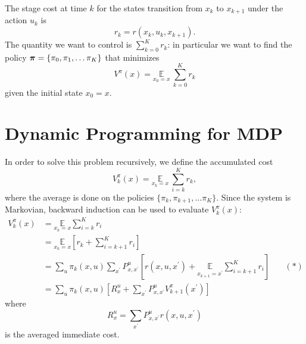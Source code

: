 The stage cost at time $k$ for the states transition from $x_k$ to $x_{k+1}$ under the action $u_k$ is
\begin{equation*}
  r_k = r(x_k,u_k,x_{k+1}).
\end{equation*}
The quantity we want to control is $\sum_{k=0}^K r_k$: in particular we want to find the policy $\boldsymbol{\pi}=\{\pi_0,\pi_1,\ldots \pi_K\}$ that minimizes
\begin{equation*}
  V^\pi(x) = \underset{x_0=x}{\mathbb{E}}\ \sum_{k=0}^K r_k
\end{equation*}
given the initial state $x_0=x$.

\section{Dynamic Programming for MDP}
\label{sec:MDP-dynamic-programming}

In order to solve this problem recursively, we define the accumulated cost
\begin{equation*}
  V_k^\pi(x) = \underset{x_k=x}{\mathbb{E}}\ \sum_{i=k}^K r_k,
\end{equation*}
where the average is done on the policies $\{\pi_k, \pi_{k+1},\ldots \pi_K\}$. Since the system is Markovian, backward induction can be used to evaluate $V_k^\pi(x)$:
\begin{equation}
  \label{eq:MDP-recursive-value}
  \begin{aligned}
    V_k^\pi(x) &= \underset{x_k=x}{\mathbb{E}}\sum_{i=k}^K r_i \\
               &= \underset{x_k=x}{\mathbb{E}}\left[r_k + \sum_{i=k+1}^K r_i\right] \\
               &= \sum_u \pi_k(x,u)\sum_{x^\prime} P_{x,x^\prime}^u \left[r(x,u,x^\prime) + \underset{x_{k+1}=x^\prime}{\mathbb{E}}\sum_{i=k+1}^K r_i\right] & \quad (*) \\
               &= \sum_u \pi_k(x,u)\left[R^u_x + \sum_{x^\prime}P_{x,x^\prime}^u V^\pi_{k+1}(x^\prime)\right]
  \end{aligned}
\end{equation}
where
\begin{equation*}
  R^u_x = \sum_{x^\prime} P^u_{x,x^\prime}r(x,u,x^\prime)
\end{equation*}
is the averaged immediate cost.

